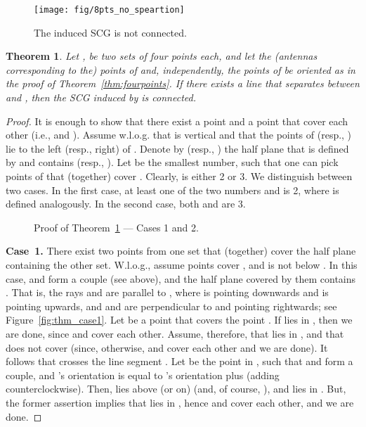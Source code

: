 \documentclass[11pt,letter]{article}
\newtheorem{theorem}{Theorem}[section]
\newcommand{\old}[1]{{{}}}
\begin{document}
\begin{figure}[htp]
   \centering
       \texttt{[image: fig/8pts\_no\_speartion]}
   \caption{The induced SCG is not connected.}
   \label{fig:8pts_no_speartion}
\end{figure}


\begin{theorem} \label{thm:twosets}
Let ,  be two sets of four points each,
and
let the (antennas corresponding to the) points of  and, independently, the points of  be oriented as in the proof of Theorem~\ref{thm:fourpoints}.
If there exists a line  that separates between  and , then
the SCG induced by  is connected.
\end{theorem}


\begin{proof}
It is enough to show that there exist a point  and a point 
that cover each other (i.e.,  and ).
Assume w.l.o.g. that  is vertical and that the points of  (resp., )
lie to the left (resp., right) of .
Denote by  (resp., ) the half plane that is defined by  and contains  (resp., ).
Let  be the smallest number, such that one can pick  points of 
that (together) cover . Clearly,  is either 2 or 3.
We distinguish between two cases. In the first case, at least one of the two numbers  and  is 2, where  is defined analogously.
In the second case, both  and  are 3.

\begin{figure}[htb]
 \centering
 \hspace{0.5cm}
\caption{Proof of Theorem~\ref{thm:twosets} --- Cases 1 and 2.}
\end{figure}




\old{
\begin{figure}[htp]
   \centering
       \texttt{[image: fig/thm\_figure4]}
   \caption{Proof of Theorem~\ref{thm:twosets} --- Case 1.}
   \label{fig:thm_case1}
\end{figure}
}
{\bf Case~1.}
There exist two points from one set that (together) cover the half plane containing the other set.
W.l.o.g., assume points  cover , and  is not below .
In this case,  and  form a couple (see above), and the half plane covered by them
contains . That is, the rays  and  are parallel to , where
 is pointing downwards and  is pointing upwards, and  and 
are perpendicular to  and pointing rightwards; see Figure~\ref{fig:thm_case1}.
Let  be a point that covers the point .
If  lies in , then we are done, since  and  cover each other.
Assume, therefore, that  lies in , and that  does not
cover  (since, otherwise,  and  cover each other and we are done).
It follows that  crosses the line segment .
Let  be the point in , such that  and  form a couple, and 's orientation is equal to 's orientation plus  (adding counterclockwise). Then,  lies above (or on)  (and, of course, ), and  lies in . But,
the former assertion implies that  lies in , hence  and  cover each other, and we are done.




\end{proof}
\end{document}
